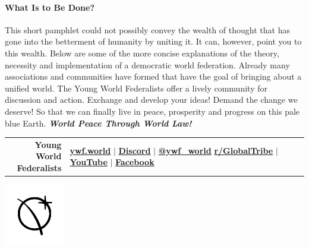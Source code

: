 \documentclass[11pt,a4paper]{article}
\begin{document}
\paragraph{What Is to Be Done?}

This short pamphlet could not possibly convey the wealth of thought that has gone into the betterment of humanity by uniting it.
It can, however, point you to this wealth.
Below are some of the more concise explanations of the theory, necessity and implementation of a democratic world federation. Already many associations and communities have formed that have the goal of bringing about a unified world.
The Young World Federalists offer a lively community for discussion and action.
Exchange and develop your ideas!
Demand the change we deserve!
So that we can finally live in peace, prosperity and progress on this pale blue Earth. \hfill \textbf{\textit{World Peace Through World Law!}}

\vspace{11pt}
\hline

\begin{multicols}{2}
\nocite{*}
\begingroup
{}
\setlength\bibitemsep{2pt}
\printbibliography[heading=none]
\endgroup
\end{multicols}

\begin{minipage}{.75\textwidth}
\begin{shaded*}
\begin{tabular}{r|l}
\makecell[r]{\large{\textbf{Young World}}\\ \large{\textbf{Federalists}}} & \makecell[l]{\textbf{\href{https://www.ywf.world}{ywf.world}} $\mid$ \textbf{\href{https://discord.gg/WyUkQps}{Discord}} $\mid$ \textbf{\href{https://twitter.com/ywf_world}{@ywf\_world}}\\  
\textbf{\href{https://www.reddit.com/r/GlobalTribe/}{r/GlobalTribe}} $\mid$ \textbf{\href{https://www.youtube.com/channel/UCBWca8XnMHF9EELWbz146pg}{YouTube}} $\mid$ \textbf{\href{https://www.facebook.com/YoungWorldFederalists/}{Facebook}}}
\end{tabular}

\end{shaded*}
\end{minipage}%
\begin{minipage}{0.25\textwidth}
\vspace{-30pt}
    \centering
    \includegraphics[height=100px]{ywf.png}

\end{minipage}
\end{document}
